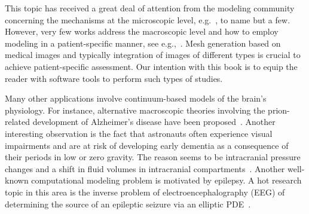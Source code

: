 This topic has received a great deal of attention from the modeling
community concerning the mechanisms at the microscopic level,
e.g.~\cite{aldea2019cerebrovascular, daversin2020mechanisms,
  diem2017arterial, holter2017interstitial, ray2019analysis,
  sharp2019dispersion, smith2017test}, to name but a few. However,
very few works address the macroscopic level and how to employ
modeling in a patient-specific manner, see e.g.,~\cite{chou2016fully,
  lee2019mixed}. Mesh generation based on medical images and typically
integration of images of different types is crucial to achieve
patient-specific assessment. Our intention with this book is to equip
the reader with software tools to perform such types of studies.

Many other applications involve continuum-based models of
the brain's physiology.  For instance, alternative macroscopic
theories involving the prion-related development of Alzheimer's
disease have been proposed~\cite{fornari2019prion,
  kevrekidis2020anisotropic}. Another interesting observation is the
fact that astronauts often experience visual impairments and are at
risk of developing early dementia as a consequence of their periods in
low or zero gravity. The reason seems to be intracranial pressure
changes and a shift in fluid volumes in intracranial
compartments~\cite{alperin2018spaceflight}.  Another well-known
computational modeling problem is motivated by epilepsy. A hot
research topic in this area is the inverse problem of
electroencephalography (EEG) of determining the source of an epileptic
seizure via an elliptic PDE~\cite{grech2008review}.

